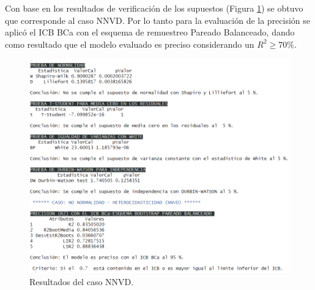 Con base en los resultados de verificación de los supuestos (Figura \ref{fig:final_NNVD_resultados}) se obtuvo que corresponde al caso NNVD. Por lo tanto para la evaluación de la precisión se aplicó el ICB BCa con el esquema de remuestreo Pareado Balanceado, dando como resultado que el modelo evaluado es preciso considerando un $R^2 \geq 70\%$.

\begin{figure}[ht!]
	\centering 
	\includegraphics[width=0.85\linewidth]{img/Uso_NNVD_PropuestaFinal.png} 
	\caption{Resultados del caso NNVD.}
	\label{fig:final_NNVD_resultados}
\end{figure}
\FloatBarrier




